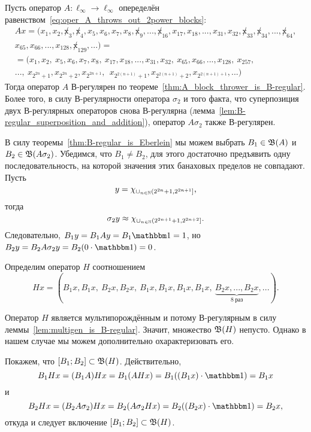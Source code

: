\begin{example}
	\label{ex:multigen_invariant_interval}
	Пусть оператор $A:\ell_\infty\to\ell_\infty$
	опеределён равенством~\eqref{eq:oper_A_throws_out_2power_blocks}:
	\begin{multline}
		Ax = (x_1, x_2, \not x_3, \not x_4, x_5, x_6, x_7, x_8, \not x_9, ..., \not x_{16}, x_{17}, x_{18}, ..., x_{31}, x_{32}, \not x_{33}, \not x_{34}, ..., \not x_{64},
		\\
		x_{65}, x_{66}, ..., x_{128}, \not x_{129}, ...)=
		\\=
		(x_1, x_2, \ x_5, x_6, x_7, x_8, \ x_{17}, x_{18}, ..., x_{31}, x_{32}, \ x_{65}, x_{66}, ..., x_{128}, \ x_{257},
		\\
		..., \ x_{2^{2n} +1}, x_{2^{2n} +2},  x_{2^{2n+1}}, \ \ x_{2^{2(n+1)} +1},  x_{2^{2(n+1)} +2},  x_{2^{2(n+1)+1}}, ...)
	\end{multline}
	Тогда оператор $A$ В-регулярен по теореме~\ref{thm:A_block_thrower_is_B-regular}.
	Более того, в силу В-регулярности оператора $\sigma_2$ и того факта,
	что суперпозиция двух В-регулярных операторов снова В-регулярна (лемма~\ref{lem:B-regular_superposition_and_addition}),
	оператор $A\sigma_2$ также В-регулярен.

	В силу теоремы~\ref{thm:B-regular_is_Eberlein} мы можем выбрать $B_1 \in \mathfrak{B} (A)$ и $B_2 \in \mathfrak{B}(A\sigma_2)$.
	Убедимся, что $B_1 \ne B_2$, для этого достаточно предъявить одну последовательность, на которой
	значения этих банаховых пределов не совпадают.
	Пусть
	\begin{equation}
		y = \chi_{\cup_{n\in\mathbb{N}}(2^{2n}+1, 2^{2n+1}]}
		,
	\end{equation}
	тогда
	\begin{equation}
		\sigma_2 y \approx \chi_{\cup_{n\in\mathbb{N}}(2^{2n+1}+1, 2^{2n+2}]}
		.
	\end{equation}
	Следовательно, $B_1y = B_1Ay = B_1\one = 1$, но $B_2y = B_2A\sigma_2 y = B_2(0\cdot \one) = 0$.

	Определим оператор $H$ соотношением
	\begin{equation}
		Hx = (B_1 x, B_1 x, \ B_2 x, B_2 x, \ B_1 x, B_1 x, B_1 x, B_1 x, \ \underbrace{B_2 x, ..., B_2 x}_{8~\mbox{раз}}, ...)
		.
	\end{equation}

	Оператор $H$ является мультипорождённым и потому В-регулярным в силу леммы~\ref{lem:multigen_is_B-regular}.
	Значит, множество $\mathfrak{B}(H)$ непусто.
	Однако в нашем случае мы можем дополнительно охарактеризовать его.

	Покажем, что $[B_1; B_2]\subset \mathfrak{B}(H)$.
	Действительно,
	\begin{equation}
		B_1 Hx  = (B_1 A) Hx = B_1 (AHx)  = B_1 ((B_1 x) \cdot \one) = B_1 x
	\end{equation}
	и
	\begin{equation}
		B_2 Hx  = (B_2 A\sigma_2) Hx = B_2 (A\sigma_2 Hx)  = B_2 ((B_2 x) \cdot \one) = B_2 x
		,
	\end{equation}
	откуда и следует включение $[B_1; B_2]\subset \mathfrak{B}(H)$.
\end{example}


